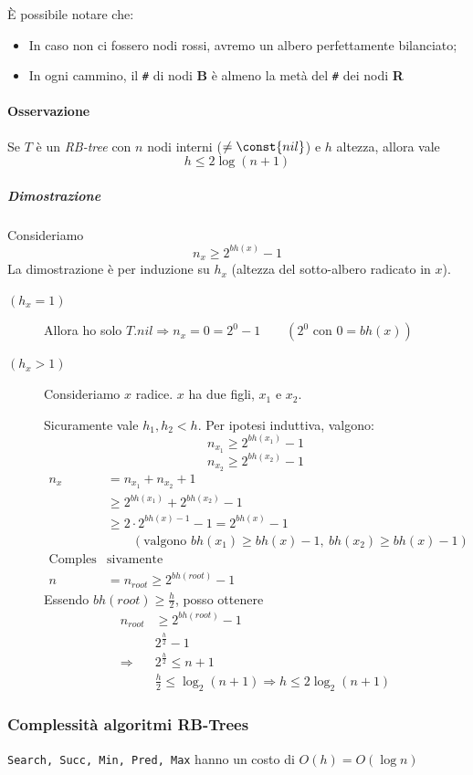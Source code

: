 È possibile notare che: 
\begin{itemize}
    \item In caso non ci fossero nodi rossi, avremo un albero
    perfettamente bilanciato;
    \item In ogni cammino, il \verb|#| di nodi \textbf{B} è almeno la
    metà del \verb|#| dei nodi \textbf{R}
\end{itemize}

\paragraph{Osservazione} Se $T$ è un \emph{RB-tree} con $n$ nodi interni ($\neq \const{nil}$)
e $h$ altezza, allora vale
$$h \leq 2 \log (n + 1)$$

\subparagraph{Dimostrazione} Consideriamo 
$$n_x \geq 2^{bh(x)} - 1$$
La dimostrazione è per induzione su $h_x$ (altezza del sotto-albero radicato in $x$).

\begin{description}
    \item[$(h_x = 1)$] Allora ho solo 
    $T.nil \Rightarrow n_x = 0 = 2^0 - 1 \qquad (2^0 \text{ con } 0 = bh(x))$
    \item[$(h_x > 1)$] Consideriamo $x$ radice. $x$ ha due figli, $x_1$ e $x_2$.\par
    Sicuramente vale $h_1,h_2 < h$. Per ipotesi induttiva, valgono:
    $$n_{x_1} \geq 2^{bh(x_1)} - 1$$
    $$n_{x_2} \geq 2^{bh(x_2)} - 1$$
    \begin{align*}
        n_x & = n_{x_1} + n_{x_2} + 1 \\
        & \geq 2^{bh(x_1)} + 2^{bh(x_2)} - 1 \\
        & \geq 2 \cdot 2^{bh(x)-1} - 1 = 2^{bh(x)} - 1 \\
        & \qquad (\text{valgono } bh(x_1) \geq bh(x)-1, \ bh(x_2) \geq bh(x)-1) \\
        \text{Comples}&\text{sivamente}\\
        n & = n_{root} \geq 2^{bh(root)} - 1
    \end{align*}
    Essendo $bh(root) \geq \frac{h}{2}$, posso ottenere
    \begin{align*}
        n_{root} & \geq 2^{bh(root)} - 1 \\
        & 2^{\frac{h}{2}} - 1 \\
        \Rightarrow \ & 2^{\frac{h}{2}} \leq n + 1 \\
        & \frac{h}{2} \leq \log_2(n+1) \Rightarrow h \leq 2 \log_2(n+1) 
    \end{align*}
\end{description}

\subsubsection{Complessità algoritmi RB-Trees}
\texttt{Search, Succ, Min, Pred, Max} hanno un costo di $O(h) = O(\log n)$